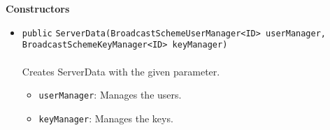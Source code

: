 \textbf{\sffamily Constructors}
\begin{itemize}
\item \lstinline|public| \lstinline|ServerData|\lstinline|(BroadcastSchemeUserManager<ID> userManager, BroadcastSchemeKeyManager<ID> keyManager)|\\ \\[-0.6em]
Creates ServerData with the given parameter.
\begin{itemize}
\item \lstinline|userManager|: Manages the users.
\item \lstinline|keyManager|: Manages the keys.
\end{itemize}



\end{itemize}


